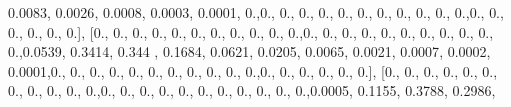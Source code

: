 \documentclass[
]{book}
\newenvironment{Shaded}{\begin{snugshade}}{\end{snugshade}}
\newcommand{\FloatTok}[1]{\textcolor[rgb]{0.00,0.00,0.81}{#1}}
\newcommand{\NormalTok}[1]{#1}
\begin{document}
\begin{Shaded}
\begin{Highlighting}[]
\FloatTok{0.0083}\NormalTok{, }\FloatTok{0.0026}\NormalTok{, }\FloatTok{0.0008}\NormalTok{, }\FloatTok{0.0003}\NormalTok{, }\FloatTok{0.0001}\NormalTok{, }\FloatTok{0.}\NormalTok{,}\FloatTok{0.}\NormalTok{, }\FloatTok{0.}\NormalTok{, }\FloatTok{0.}\NormalTok{, }\FloatTok{0.}\NormalTok{, }\FloatTok{0.}\NormalTok{, }\FloatTok{0.}\NormalTok{, }\FloatTok{0.}\NormalTok{, }\FloatTok{0.}\NormalTok{, }\FloatTok{0.}\NormalTok{,}
\FloatTok{0.}\NormalTok{, }\FloatTok{0.}\NormalTok{,}\FloatTok{0.}\NormalTok{, }\FloatTok{0.}\NormalTok{, }\FloatTok{0.}\NormalTok{, }\FloatTok{0.}\NormalTok{, }\FloatTok{0.}\NormalTok{, }\FloatTok{0.}\NormalTok{], [}\FloatTok{0.}\NormalTok{, }\FloatTok{0.}\NormalTok{, }\FloatTok{0.}\NormalTok{, }\FloatTok{0.}\NormalTok{, }\FloatTok{0.}\NormalTok{, }\FloatTok{0.}\NormalTok{, }\FloatTok{0.}\NormalTok{, }\FloatTok{0.}\NormalTok{, }\FloatTok{0.}\NormalTok{, }\FloatTok{0.}\NormalTok{, }\FloatTok{0.}\NormalTok{,}\FloatTok{0.}\NormalTok{,}
\FloatTok{0.}\NormalTok{, }\FloatTok{0.}\NormalTok{, }\FloatTok{0.}\NormalTok{, }\FloatTok{0.}\NormalTok{, }\FloatTok{0.}\NormalTok{, }\FloatTok{0.}\NormalTok{, }\FloatTok{0.}\NormalTok{, }\FloatTok{0.}\NormalTok{, }\FloatTok{0.}\NormalTok{, }\FloatTok{0.}\NormalTok{,}\FloatTok{0.0539}\NormalTok{, }\FloatTok{0.3414}\NormalTok{, }\FloatTok{0.344}\NormalTok{ , }\FloatTok{0.1684}\NormalTok{, }\FloatTok{0.0621}\NormalTok{,}
\FloatTok{0.0205}\NormalTok{, }\FloatTok{0.0065}\NormalTok{, }\FloatTok{0.0021}\NormalTok{, }\FloatTok{0.0007}\NormalTok{, }\FloatTok{0.0002}\NormalTok{, }\FloatTok{0.0001}\NormalTok{,}\FloatTok{0.}\NormalTok{, }\FloatTok{0.}\NormalTok{, }\FloatTok{0.}\NormalTok{, }\FloatTok{0.}\NormalTok{, }\FloatTok{0.}\NormalTok{, }\FloatTok{0.}\NormalTok{, }\FloatTok{0.}\NormalTok{, }\FloatTok{0.}\NormalTok{,}
\FloatTok{0.}\NormalTok{, }\FloatTok{0.}\NormalTok{, }\FloatTok{0.}\NormalTok{,}\FloatTok{0.}\NormalTok{, }\FloatTok{0.}\NormalTok{, }\FloatTok{0.}\NormalTok{, }\FloatTok{0.}\NormalTok{, }\FloatTok{0.}\NormalTok{, }\FloatTok{0.}\NormalTok{], [}\FloatTok{0.}\NormalTok{, }\FloatTok{0.}\NormalTok{, }\FloatTok{0.}\NormalTok{, }\FloatTok{0.}\NormalTok{, }\FloatTok{0.}\NormalTok{, }\FloatTok{0.}\NormalTok{, }\FloatTok{0.}\NormalTok{, }\FloatTok{0.}\NormalTok{, }\FloatTok{0.}\NormalTok{, }\FloatTok{0.}\NormalTok{,}
\FloatTok{0.}\NormalTok{,}\FloatTok{0.}\NormalTok{, }\FloatTok{0.}\NormalTok{, }\FloatTok{0.}\NormalTok{, }\FloatTok{0.}\NormalTok{, }\FloatTok{0.}\NormalTok{, }\FloatTok{0.}\NormalTok{, }\FloatTok{0.}\NormalTok{, }\FloatTok{0.}\NormalTok{, }\FloatTok{0.}\NormalTok{, }\FloatTok{0.}\NormalTok{, }\FloatTok{0.}\NormalTok{,}\FloatTok{0.0005}\NormalTok{, }\FloatTok{0.1155}\NormalTok{, }\FloatTok{0.3788}\NormalTok{, }\FloatTok{0.2986}\NormalTok{,}

\end{Highlighting}
\end{Shaded}
\end{document}
